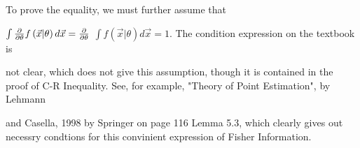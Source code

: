 \documentclass{article}
\begin{document}
To prove the equality, we must further assume that 

$\int \frac{\partial }{\partial \theta }f\left( \vec{x}|\theta \right) d\vec{%
x}=\frac{\partial }{\partial \theta }$ $\int f\left( \vec{x}|\theta \right) d%
\vec{x}=1.$ The condition expression on the textbook is 

not clear, which does not give this assumption, though it is contained in
the proof of C-R Inequality. See, for example, "Theory of Point Estimation",
by Lehmann

and Casella, 1998 by Springer on page 116 Lemma 5.3, which clearly gives out
necessry condtions for this convinient expression of Fisher Information.

\end{document}
